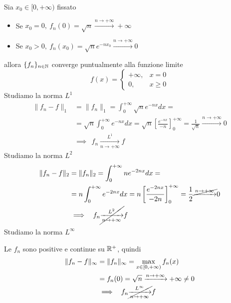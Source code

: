 Sia $x_{0} \in [ 0, + \infty)$ fissato
\begin{itemize}
\item Se $x_{0} = 0, \ f_{n}(0) = \sqrt{n}\xrightarrow{n\rightarrow + \infty} + \infty $
\item Se $x_{0} > 0, \ f_{n}(x_{0}) = \sqrt{n} e^{- nx_{0}}\xrightarrow{n\rightarrow + \infty} 0$
\end{itemize}
allora $\{f_{n}\}_{n\in \mathbb{N}}$ converge puntualmente alla funzione limite
\begin{equation*}
f(x) =
\begin{cases}
+ \infty, & x = 0\\
0, & x \geq 0
\end{cases}
\end{equation*}
Studiamo la norma $L^{1}$
\begin{equation*}
\begin{aligned}
\| f_{n} - f\|_{1} & = \| f_{n} \|_{1} = \int^{+ \infty}_{0}\sqrt{n} e^{- nx} dx = \\
 & = \sqrt{n}\int^{+ \infty}_{0} e^{- nx} dx = \sqrt{n}\left[\frac{e^{- nx}}{- n}\right]^{+ \infty}_{0} = \frac{1}{\sqrt{n}}\xrightarrow{n\rightarrow + \infty} 0\\
 & \implies \ \ f_{n}\xrightarrow[n\rightarrow + \infty ]{L^{1}} f
\end{aligned}
\end{equation*}
Studiamo la norma $L^{2}$
\begin{equation*}
\begin{aligned}
\| f_{n} - f\|_{2} & = \| f_{n} \|_{2} = \int^{+ \infty}_{0} ne^{- 2nx} dx = \\
 & = n\int^{+ \infty}_{0} e^{- 2nx} dx = n\left[\frac{e^{- 2nx}}{- 2n}\right]^{+ \infty}_{0} = \frac{1}{2}\cancel{\xrightarrow{n\rightarrow + \infty}} 0\\
 & \implies \ \ f_{n}\cancel{\xrightarrow[n\rightarrow + \infty ]{L^{2}}} f
\end{aligned}
\end{equation*}
Studiamo la norma $L^{\infty}$

Le $f_{n}$ sono positive e continue su $\mathbb{R}^{+}$, quindi
\begin{equation*}
\begin{aligned}
\| f_{n} - f\|_{\infty} & = \| f_{n} \|_{\infty} = \max_{x\in [ 0, + \infty)} f_{n}(x)\\
 & = f_{n}(0) = \sqrt{n}\xrightarrow{n\rightarrow + \infty} + \infty \neq 0\\
 & \implies \ \ f_{n}\cancel{\xrightarrow[n\rightarrow + \infty ]{L^{\infty}}} f
\end{aligned}
\end{equation*}
\Soluzione

